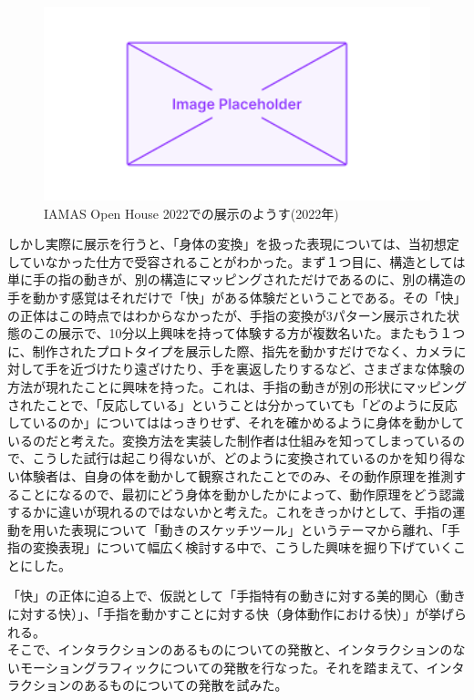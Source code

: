 \begin{figure}[H]
  \centering
  \includegraphics[width=15cm]{img/placeholder.png}
  \caption{IAMAS Open House 2022での展示のようす(2022年)}
  \label{fig:exhibit_2022}
\end{figure}

しかし実際に展示を行うと、「身体の変換」を扱った表現については、当初想定していなかった仕方で受容されることがわかった。まず１つ目に、構造としては単に手の指の動きが、別の構造にマッピングされただけであるのに、別の構造の手を動かす感覚はそれだけで「快」がある体験だということである。その「快」の正体はこの時点ではわからなかったが、手指の変換が3パターン展示された状態のこの展示で、10分以上興味を持って体験する方が複数名いた。またもう１つに、制作されたプロトタイプを展示した際、指先を動かすだけでなく、カメラに対して手を近づけたり遠ざけたり、手を裏返したりするなど、さまざまな体験の方法が現れたことに興味を持った。これは、手指の動きが別の形状にマッピングされたことで、「反応している」ということは分かっていても「どのように反応しているのか」についてははっきりせず、それを確かめるように身体を動かしているのだと考えた。変換方法を実装した制作者は仕組みを知ってしまっているので、こうした試行は起こり得ないが、どのように変換されているのかを知り得ない体験者は、自身の体を動かして観察されたことでのみ、その動作原理を推測することになるので、最初にどう身体を動かしたかによって、動作原理をどう認識するかに違いが現れるのではないかと考えた。これをきっかけとして、手指の運動を用いた表現について「動きのスケッチツール」というテーマから離れ、「手指の変換表現」について幅広く検討する中で、こうした興味を掘り下げていくことにした。

「快」の正体に迫る上で、仮説として「手指特有の動きに対する美的関心（動きに対する快）」、「手指を動かすことに対する快（身体動作における快）」が挙げられる。\\
そこで、インタラクションのあるものについての発散と、インタラクションのないモーショングラフィックについての発散を行なった。それを踏まえて、インタラクションのあるものについての発散を試みた。


